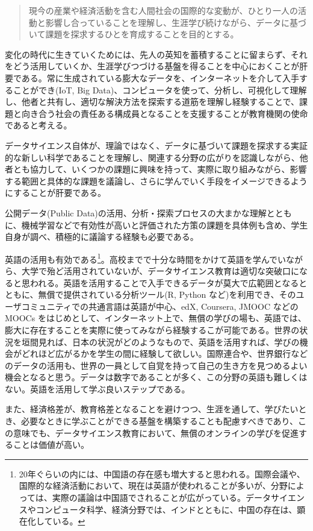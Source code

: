 \documentclass[
]{bxjsbook}
\theoremstyle{definition}
\theoremstyle{definition}
\theoremstyle{definition}
\theoremstyle{definition}
\theoremstyle{remark}
\begin{document}
\begin{quote}
現今の産業や経済活動を含む人間社会の国際的な変動が、ひとり一人の活動と影響し合っていることを理解し、生涯学び続けながら、データに基づいて課題を探求するひとを育成することを目的とする。
\end{quote}

変化の時代に生きていくためには、先人の英知を蓄積することに留まらず、それをどう活用していくか、生涯学びつづける基盤を得ることを中心におくことが肝要である。常に生成されている膨大なデータを、インターネットを介して入手することができ(IoT, Big Data)、コンピュータを使って、分析し、可視化して理解し、他者と共有し、適切な解決方法を探索する道筋を理解し経験することで、課題と向き合う社会の責任ある構成員となることを支援することが教育機関の使命であると考える。

データサイエンス自体が、理論ではなく、データに基づいて課題を探求する実証的な新しい科学であることを理解し、関連する分野の広がりを認識しながら、他者とも協力して、いくつかの課題に興味を持って、実際に取り組みながら、影響する範囲と具体的な課題を議論し、さらに学んでいく手段をイメージできるようにすることが肝要である。

公開データ(Public Data)の活用、分析・探索プロセスの大まかな理解とともに、機械学習などで有効性が高いと評価された方策の課題を具体例も含め、学生自身が調べ、積極的に議論する経験も必要である。

英語の活用も有効である\footnote{20年ぐらいの内には、中国語の存在感も増大すると思われる。国際会議や、国際的な経済活動において、現在は英語が使われることが多いが、分野によっては、実際の議論は中国語でされることが広がっている。データサイエンスやコンピュータ科学、経済分野では、インドとともに、中国の存在は、顕在化している。}。高校までで十分な時間をかけて英語を学んでいながら、大学で殆ど活用されていないが、データサイエンス教育は適切な突破口になると思われる。英語を活用することで入手できるデータが莫大で広範囲となるとともに、無償で提供されている分析ツール(R, Python など)を利用でき、そのユーザコミュニティでの共通言語は英語が中心、edX, Coursera, JMOOC などの MOOCs をはじめとして、インターネット上で、無償の学びの場も、英語では、膨大に存在することを実際に使ってみながら経験するこが可能である。世界の状況を垣間見れば、日本の状況がどのようなもので、英語を活用すれば、学びの機会がどれほど広がるかを学生の間に経験して欲しい。国際連合や、世界銀行などのデータの活用も、世界の一員として自覚を持って自己の生き方を見つめるよい機会となると思う。データは数字であることが多く、この分野の英語も難しくはない。英語を活用して学ぶ良いステップである。

また、経済格差が、教育格差となることを避けつつ、生涯を通して、学びたいとき、必要なときに学ぶことができる基盤を構築することも配慮すべきであり、この意味でも、データサイエンス教育において、無償のオンラインの学びを促進することは価値が高い。
\end{document}
